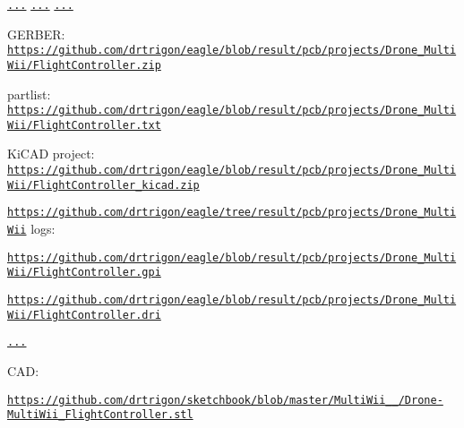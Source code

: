  \href{https://edrc.me/g/drtrigon/eagle}{\tt ...}  \href{https://github.com/drtrigon/eagle/blob/result/pcb/projects/Drone_MultiWii/FlightController_brd.png}{\tt ...}  \href{https://github.com/drtrigon/eagle/blob/result/pcb/projects/Drone_MultiWii/FlightController.png}{\tt ...}
\begin{DoxyItemize}
\item G\-E\-R\-B\-E\-R\-: \href{https://github.com/drtrigon/eagle/blob/result/pcb/projects/Drone_MultiWii/FlightController.zip}{\tt https\-://github.\-com/drtrigon/eagle/blob/result/pcb/projects/\-Drone\-\_\-\-Multi\-Wii/\-Flight\-Controller.\-zip}
\item partlist\-: \href{https://github.com/drtrigon/eagle/blob/result/pcb/projects/Drone_MultiWii/FlightController.txt}{\tt https\-://github.\-com/drtrigon/eagle/blob/result/pcb/projects/\-Drone\-\_\-\-Multi\-Wii/\-Flight\-Controller.\-txt}
\item Ki\-C\-A\-D project\-: \href{https://github.com/drtrigon/eagle/blob/result/pcb/projects/Drone_MultiWii/FlightController_kicad.zip}{\tt https\-://github.\-com/drtrigon/eagle/blob/result/pcb/projects/\-Drone\-\_\-\-Multi\-Wii/\-Flight\-Controller\-\_\-kicad.\-zip}
\end{DoxyItemize}

\href{https://github.com/drtrigon/eagle/tree/result/pcb/projects/Drone_MultiWii}{\tt https\-://github.\-com/drtrigon/eagle/tree/result/pcb/projects/\-Drone\-\_\-\-Multi\-Wii} logs\-:
\begin{DoxyItemize}
\item \href{https://github.com/drtrigon/eagle/blob/result/pcb/projects/Drone_MultiWii/FlightController.gpi}{\tt https\-://github.\-com/drtrigon/eagle/blob/result/pcb/projects/\-Drone\-\_\-\-Multi\-Wii/\-Flight\-Controller.\-gpi}
\item \href{https://github.com/drtrigon/eagle/blob/result/pcb/projects/Drone_MultiWii/FlightController.dri}{\tt https\-://github.\-com/drtrigon/eagle/blob/result/pcb/projects/\-Drone\-\_\-\-Multi\-Wii/\-Flight\-Controller.\-dri}
\end{DoxyItemize}

 \href{https://github.com/drtrigon/eagle/blob/result/pcb/projects/Drone_MultiWii/FlightController_auto.png}{\tt ...}

C\-A\-D\-:
\begin{DoxyItemize}
\item \href{https://github.com/drtrigon/sketchbook/blob/master/MultiWii_2_4/Drone-MultiWii_FlightController.stl}{\tt https\-://github.\-com/drtrigon/sketchbook/blob/master/\-Multi\-Wii\-\_\-\_/\-Drone-\/\-Multi\-Wii\-\_\-\-Flight\-Controller.\-stl}
\end{DoxyItemize}

